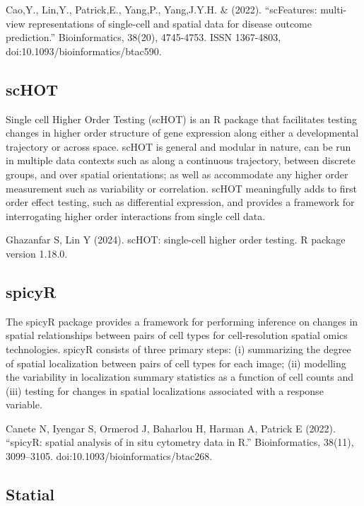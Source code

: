 \documentclass[
  letterpaper,
  DIV=11,
  numbers=noendperiod]{scrreprt}
\begin{document}
Cao,Y., Lin,Y., Patrick,E., Yang,P., Yang,J.Y.H. \& (2022).
``scFeatures: multi-view representations of single-cell and spatial data
for disease outcome prediction.'' Bioinformatics, 38(20), 4745-4753.
ISSN 1367-4803, doi:10.1093/bioinformatics/btac590.

\subsection*{scHOT}\label{schot}

Single cell Higher Order Testing (scHOT) is an R package that
facilitates testing changes in higher order structure of gene expression
along either a developmental trajectory or across space. scHOT is
general and modular in nature, can be run in multiple data contexts such
as along a continuous trajectory, between discrete groups, and over
spatial orientations; as well as accommodate any higher order
measurement such as variability or correlation. scHOT meaningfully adds
to first order effect testing, such as differential expression, and
provides a framework for interrogating higher order interactions from
single cell data.

Ghazanfar S, Lin Y (2024). scHOT: single-cell higher order testing. R
package version 1.18.0.

\subsection*{spicyR}\label{spicyr}

The spicyR package provides a framework for performing inference on
changes in spatial relationships between pairs of cell types for
cell-resolution spatial omics technologies. spicyR consists of three
primary steps: (i) summarizing the degree of spatial localization
between pairs of cell types for each image; (ii) modelling the
variability in localization summary statistics as a function of cell
counts and (iii) testing for changes in spatial localizations associated
with a response variable.

Canete N, Iyengar S, Ormerod J, Baharlou H, Harman A, Patrick E (2022).
``spicyR: spatial analysis of in situ cytometry data in R.''
Bioinformatics, 38(11), 3099--3105. doi:10.1093/bioinformatics/btac268.

\subsection*{Statial}\label{statial}
\end{document}
